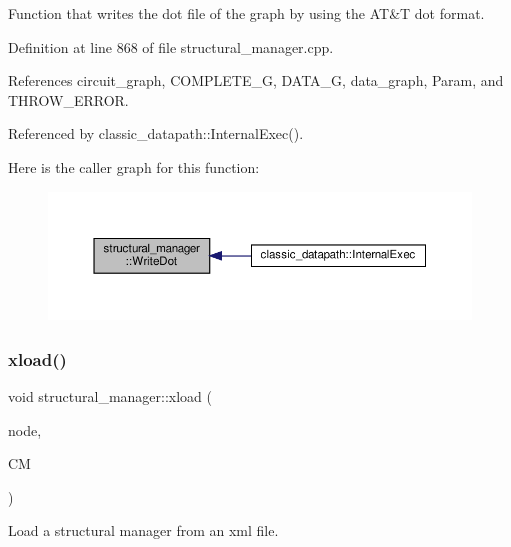 Function that writes the dot file of the graph by using the AT\&T dot format. 



Definition at line 868 of file structural\+\_\+manager.\+cpp.



References circuit\+\_\+graph, C\+O\+M\+P\+L\+E\+T\+E\+\_\+G, D\+A\+T\+A\+\_\+G, data\+\_\+graph, Param, and T\+H\+R\+O\+W\+\_\+\+E\+R\+R\+OR.



Referenced by classic\+\_\+datapath\+::\+Internal\+Exec().

Here is the caller graph for this function\+:
\nopagebreak
\begin{figure}[H]
\begin{center}
\leavevmode
\includegraphics[width=350pt]{d7/d6b/classstructural__manager_a8e2dcf5f78cb66140be239eeec3ff762_icgraph}
\end{center}
\end{figure}
\mbox{\label{classstructural__manager_a13ea548d745b21b07a8cca52a67bb7cf}} 
\subsubsection{\texorpdfstring{xload()}{xload()}}
{\footnotesize\ttfamily void structural\+\_\+manager\+::xload (\begin{DoxyParamCaption}\item[{const \hyperlink{classxml__element}{xml\+\_\+element} $\ast$}]{node,  }\item[{\hyperlink{structural__manager_8hpp_ab3136f0e785d8535f8d252a7b53db5b5}{structural\+\_\+manager\+Ref} const \&}]{CM }\end{DoxyParamCaption})\hspace{0.3cm}{\ttfamily [static]}}



Load a structural manager from an xml file. 


